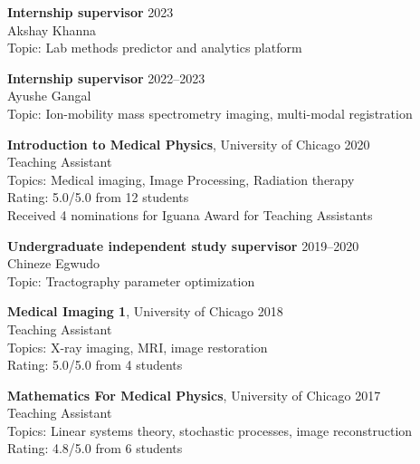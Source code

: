\documentclass[10pt,letterpaper]{article}
\begin{document}
\begin{benumerate}{6}

\item
  \textbf{Internship supervisor} \hfill 2023\\
  Akshay Khanna\\
  Topic: Lab methods predictor and analytics platform
\item
  \textbf{Internship supervisor} \hfill 2022--2023\\
  Ayushe Gangal\\
  Topic: Ion-mobility mass spectrometry imaging, multi-modal registration
\item
  \textbf{Introduction to Medical Physics}, University of Chicago \hfill 2020\\
  Teaching Assistant\\
  Topics: Medical imaging, Image Processing, Radiation therapy\\
  Rating: 5.0/5.0 from 12 students\\
  Received 4 nominations for Iguana Award for Teaching Assistants
\item
  \textbf{Undergraduate independent study supervisor} \hfill 2019--2020\\
  Chineze Egwudo\\
  Topic: Tractography parameter optimization
  
\item
  \textbf{Medical Imaging 1}, University of Chicago \hfill 2018\\
  Teaching Assistant\\
  Topics: X-ray imaging, MRI, image restoration\\
  Rating: 5.0/5.0 from 4 students
\item
  \textbf{Mathematics For Medical Physics}, University of Chicago \hfill 2017\\
  Teaching Assistant\\
  Topics: Linear systems theory, stochastic processes, image reconstruction\\
  Rating: 4.8/5.0 from 6 students
\end{benumerate}
\end{document}
